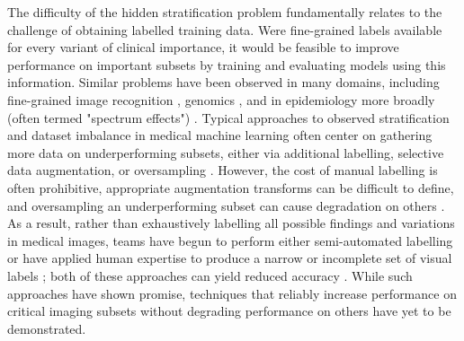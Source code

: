 \documentclass{article}
\begin{document}
The difficulty of the hidden stratification problem fundamentally relates to the challenge of obtaining labelled training data.  
Were fine-grained labels available for every variant of clinical importance, it would be feasible to improve performance on important subsets by training and evaluating models using this information.  
Similar problems have been observed in many domains, including fine-grained image recognition \citep{yao2011combining}, genomics \citep{cardon2003population}, and in epidemiology more broadly (often termed "spectrum effects") \citep{mulherin2002spectrum}.
Typical approaches to observed stratification and dataset imbalance in medical machine learning often center on gathering more data on underperforming subsets, either via additional labelling, selective data augmentation, or oversampling \citep{Mazurowski2008-cq}.  
However, the cost of manual labelling is often prohibitive, appropriate augmentation transforms can be difficult to define, and oversampling an underperforming subset can cause degradation on others \citep{Fries2019-ze, Ratner2017-td, Buda2018-ab, Zech2018-xq}.  
As a result, rather than exhaustively labelling all possible findings and variations in medical images, teams have begun to perform either semi-automated labelling \citep{Wang2017-vm, Fries2019-ze, Irvin2019-ho, Dunnmon2019-zw, Fries2019-ze}  or have applied human expertise to produce a narrow or incomplete set of visual labels \citep{Rajpurkar2017-rc}; both
of these approaches can yield reduced accuracy \citep{Oakden-Rayner2019-yi}.  
While such approaches have shown promise, techniques that reliably increase performance on critical imaging subsets without degrading performance on others have yet to be demonstrated.
 
\end{document}
